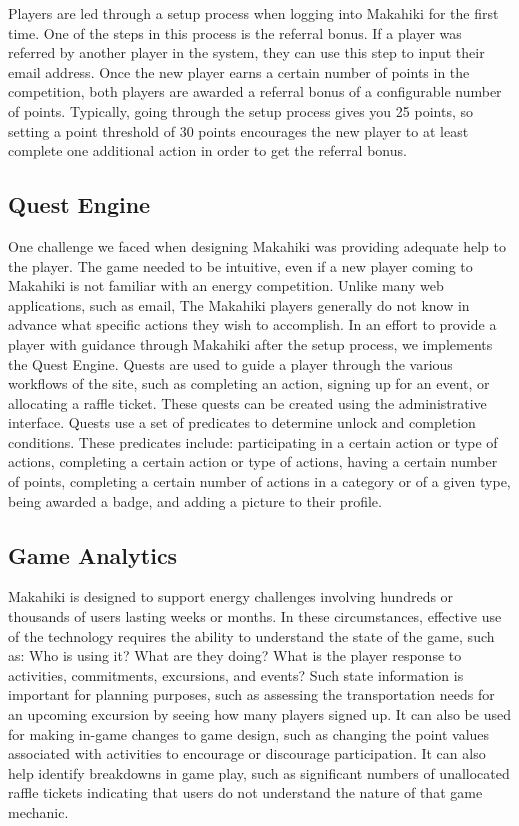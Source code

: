 Players are led through a setup process when logging into Makahiki for the first time. One of the steps in this process is the referral bonus. If a player was referred by another player in the system, they can use this step to input their email address. Once the new player earns a certain number of points in the competition, both players are awarded a referral bonus of a configurable number of points. Typically, going through the setup process gives you 25 points, so setting a point threshold of 30 points encourages the new player to at least complete one additional action in order to get the referral bonus.

\subsection{Quest Engine}

One challenge we faced when designing Makahiki was providing adequate help to the player. The game needed to be intuitive, even if a new player coming to Makahiki is not familiar with an energy competition. Unlike many web applications, such as email, The Makahiki players generally do not know in advance what specific actions they wish to accomplish. In an effort to provide a player with guidance through Makahiki after the setup process, we implements the Quest Engine. Quests are used to guide a player through the various workflows of the site, such as completing an action, signing up for an event, or allocating a raffle ticket. These quests can be created using the administrative interface. Quests use a set of predicates to determine unlock and completion conditions. These predicates include: participating in a certain action or type of actions, completing a certain action or type of actions, having a certain number of points, completing a certain number of actions in a category or of a given type, being awarded a badge, and adding a picture to their profile.

\subsection{Game Analytics}

Makahiki is designed to support energy challenges involving hundreds or thousands of users lasting weeks or months.  In these circumstances, effective use of the technology requires the ability to understand the state of the game, such as: Who is using it? What are they doing? What is the player response to activities, commitments, excursions, and events?   Such state information is important for planning purposes, such as assessing the transportation needs for an upcoming excursion by seeing how many players signed up.   It can also be used for making in-game changes to game design, such as changing the point values associated with activities to encourage or discourage participation.  It can also help identify breakdowns in game play, such as significant numbers of unallocated raffle tickets indicating that users do not understand the nature of that game mechanic.  


